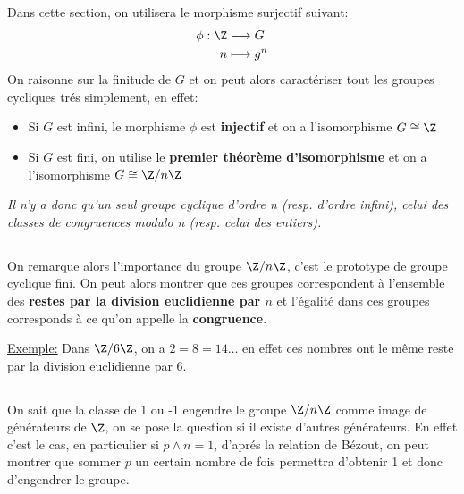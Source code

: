 \subsection*{}
Dans cette section, on utilisera le morphisme surjectif suivant:
\[
   \begin{aligned}
      \phi: \Z &\longrightarrow G\\
      n &\longmapsto g^n
   \end{aligned}
\]
On raisonne sur la finitude de \( G \) et on peut alors caractériser tout les groupes cycliques trés simplement, en effet:
\begin{itemize}
   \item Si \(G\) est infini, le morphisme \(\phi\) est \textbf{injectif} et on a l'isomorphisme \( G \cong \Z \)
   \item Si \(G\) est fini, on utilise le \textbf{premier théorème d'isomorphisme} et on a l'isomorphisme  \( G \cong \Z/n\Z \)
\end{itemize}
\begin{center}
   \textit{Il n'y a donc qu'un seul groupe cyclique d'ordre n (resp. d'ordre infini), celui des classes de congruences modulo n (resp. celui des entiers).}
\end{center}
\subsection*{}
On remarque alors l'importance du groupe \( \Z/n\Z \), c'est le prototype de groupe cyclique fini. On peut alors montrer que ces groupes correspondent à l'ensemble des \textbf{restes par la division euclidienne par \( n \)} et l'égalité dans ces groupes corresponds à ce qu'on appelle la \textbf{congruence}.\<

\uline{Exemple:} Dans \( \Z/6\Z\), on a \( 2 = 8 = 14 \ldots\) en effet ces nombres ont le même reste par la division euclidienne par \( 6 \).
\subsection*{}
On sait que la classe de 1 ou -1 engendre le groupe  \( \Z/n\Z \) comme image de générateurs de \( \Z \), on se pose la question si il existe d'autres générateurs. En effet c'est le cas, en particulier si \( p \wedge n = 1 \), d'aprés la relation de Bézout, on peut montrer que sommer \( p \) un certain nombre de fois permettra d'obtenir 1 et donc d'engendrer le groupe.\<

